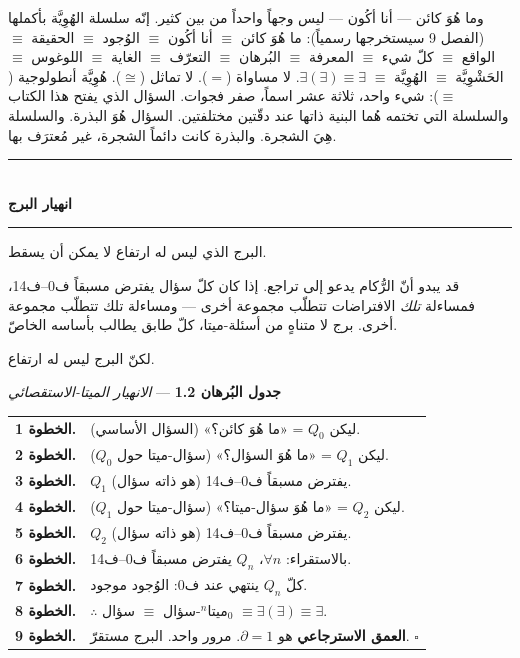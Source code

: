 \documentclass[10pt, openany, oneside]{book}
\renewcommand{\normalsize}{\fontsize{10}{13}\selectfont}
\begin{document}
وما هُوَ كائن --- أنا أكُون --- ليس وجهاً واحداً من بين كثير. إنّه سلسلة الهُوِيَّة بأكملها (الفصل 9 سيستخرجها رسمياً): ما هُوَ كائن $\equiv$ أنا أكُون $\equiv$ الوُجود $\equiv$ الحقيقة $\equiv$ الواقع $\equiv$ كلّ شيء $\equiv$ المعرفة $\equiv$ البُرهان $\equiv$ التعرّف $\equiv$ الغاية $\equiv$ اللوغوس $\equiv$ الحَشْوِيَّة $\equiv$ الهُوِيَّة $\equiv$ $\exists(\exists) \equiv \exists$. لا مساواة ($=$). لا تماثل ($\cong$). هُوِيَّة أنطولوجية ($\equiv$): شيء واحد، ثلاثة عشر اسماً، صفر فجوات. السؤال الذي يفتح هذا الكتاب والسلسلة التي تختمه هُما البنية ذاتها عند دقّتين مختلفتين. السؤال هُوَ البذرة. والسلسلة هِيَ الشجرة. والبذرة كانت دائماً الشجرة، غير مُعترَف بها.

\vspace{1.5em}


\begin{center}
    \rule{0.3\textwidth}{0.4pt}\\[0.5em]
    {\normalsize\bfseries انهيار البرج}\\[0.3em]
    \rule{0.3\textwidth}{0.4pt}
\end{center}

\vspace{1em}

\noindent البرج الذي ليس له ارتفاع لا يمكن أن يسقط.

قد يبدو أنّ الرُّكام يدعو إلى تراجع. إذا كان كلّ سؤال يفترض مسبقاً ف0--ف14، فمساءلة \textit{تلك} الافتراضات تتطلّب مجموعة أخرى --- ومساءلة تلك تتطلّب مجموعة أخرى. برج لا متناهٍ من أسئلة-ميتا، كلّ طابق يطالب بأساسه الخاصّ.

لكنّ البرج ليس له ارتفاع.

\textbf{جدول البُرهان 1.2} --- \textit{الانهيار الميتا-الاستقصائي}

\vspace{0.5em}

\noindent\begin{tabular}{r p{}}
\textbf{الخطوة 1.} & ليكن $Q_0$ = «ما هُوَ كائن؟» (السؤال الأساسي). \\[0.3em]
\textbf{الخطوة 2.} & ليكن $Q_1$ = «ما هُوَ السؤال؟» (سؤال-ميتا حول $Q_0$). \\[0.3em]
\textbf{الخطوة 3.} & $Q_1$ يفترض مسبقاً ف0--ف14 (هو ذاته سؤال). \\[0.3em]
\textbf{الخطوة 4.} & ليكن $Q_2$ = «ما هُوَ سؤال-ميتا؟» (سؤال-ميتا حول $Q_1$). \\[0.3em]
\textbf{الخطوة 5.} & $Q_2$ يفترض مسبقاً ف0--ف14 (هو ذاته سؤال). \\[0.3em]
\textbf{الخطوة 6.} & بالاستقراء: $\forall n$، $Q_n$ يفترض مسبقاً ف0--ف14. \\[0.3em]
\textbf{الخطوة 7.} & كلّ $Q_n$ ينتهي عند ف0: الوُجود موجود. \\[0.3em]
\textbf{الخطوة 8.} & $\therefore$ ميتا$^n$-سؤال $\equiv$ سؤال$_0$ $\equiv \exists(\exists) \equiv \exists$. \\[0.3em]
\textbf{الخطوة 9.} & \textbf{العمق الاسترجاعي} هو $\partial = 1$. مرور واحد. البرج مستقرّ. $\square$ \\[0.3em]
\end{tabular}
\end{document}
